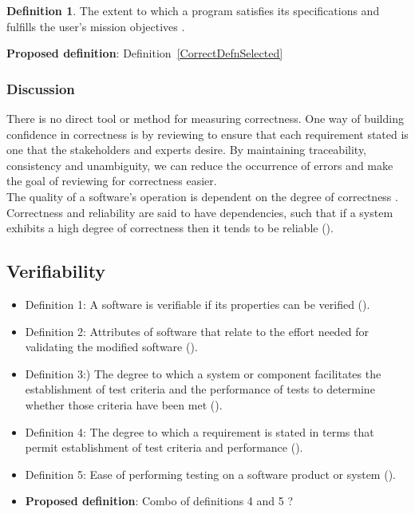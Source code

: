 \documentclass[letterpaper,cleveref]{lipics-v2019}
\theoremstyle{definition}
\newtheorem{defn}{Definition}
\begin{document}
\begin{defn}
  The extent to which a program satisfies its specifications and fulfills the
  user's mission objectives \citep{McCallEtAl1977}.
\end{defn}

\noindent \textbf{Proposed definition}: Definition~\ref{CorrectDefnSelected}
	
\subsubsection{Discussion}
There is no direct tool or
method for measuring correctness. One way of building confidence in correctness
is by reviewing to ensure that each requirement stated is one that the
stakeholders and experts desire.  By maintaining traceability, consistency and
unambiguity, we can reduce the occurrence of errors and make the goal of
reviewing for correctness easier.\\
 The quality of a software's operation is dependent on the degree of correctness \cite{berander2005software}. Correctness and reliability are said to have dependencies, such that if a system exhibits a high degree of correctness then it tends to be reliable (\cite{GhezziEtAl2003}).

\subsection{Verifiability}
\begin{itemize}
	\item{Definition 1:} A software is verifiable if its properties can be verified (\cite{GhezziEtAl2003}).\\
	\item{Definition 2:} Attributes of software that relate to the effort needed for validating the modified software (\cite{berander2005software}).\\
	\item{Definition 3:}) The degree to which a system or component facilitates the establishment of test criteria and the performance of tests to determine whether those criteria have been met (\cite{IEEEStdGlossarySET1990}).\\
	\item{Definition 4:}  The degree to which a requirement is stated in terms that permit establishment of test criteria and performance (\cite{IEEEStdGlossarySET1990}).\\
	\item{Definition 5:} Ease of performing testing on a software product or system (\cite{IEEEStdGlossarySET1990}).\\
	\item{\textbf{Proposed definition}:} Combo of definitions 4 and 5 ?\\
\end{itemize}
\end{document}
